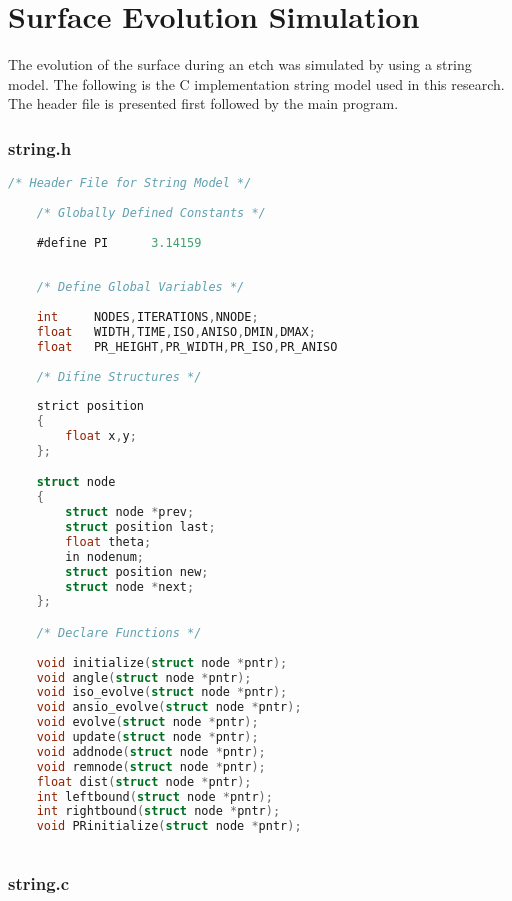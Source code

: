 \chapter{Surface Evolution Simulation}

\tab The evolution of the surface during an etch was simulated by using a string model. The
following is the C implementation string model used in this research. The header file is
presented first followed by the main program.


\subsection{string.h}

\begin{lstlisting}[language=C]
	/* Header File for String Model */
	
	/* Globally Defined Constants */
	
	#define PI		3.14159
	
	
	/* Define Global Variables */
	
	int		NODES,ITERATIONS,NNODE;
	float	WIDTH,TIME,ISO,ANISO,DMIN,DMAX;
	float	PR_HEIGHT,PR_WIDTH,PR_ISO,PR_ANISO
	
	/* Difine Structures */
	
	strict position
	{
		float x,y;
	};

	struct node
	{
		struct node *prev;
		struct position last;
		float theta;
		in nodenum;
		struct position new;
		struct node *next;
	};

	/* Declare Functions */
	
	void initialize(struct node *pntr);
	void angle(struct node *pntr);
	void iso_evolve(struct node *pntr);
	void ansio_evolve(struct node *pntr);
	void evolve(struct node *pntr);
	void update(struct node *pntr);
	void addnode(struct node *pntr);
	void remnode(struct node *pntr);
	float dist(struct node *pntr);
	int leftbound(struct node *pntr);
	int rightbound(struct node *pntr);
	void PRinitialize(struct node *pntr);
	
\end{lstlisting}

\newpage

\subsection{string.c}


